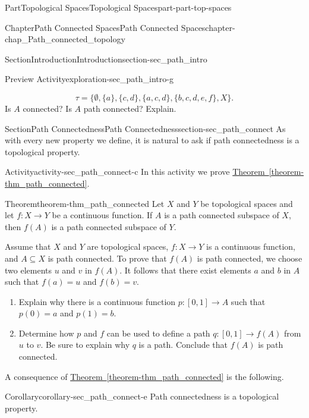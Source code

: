 \documentclass[oneside,10pt,]{book}
\newcommand{\xreffont}{\relax}
\numberwithin{equation}{chapter}
\begin{document}
\begin{partptx}{Part}{Topological Spaces}{}{Topological Spaces}{}{}{part-part-top-spaces}
\begin{chapterptx}{Chapter}{Path Connected Spaces}{}{Path Connected Spaces}{}{}{chapter-chap_Path_connected_topology}
\begin{sectionptx}{Section}{Introduction}{}{Introduction}{}{}{section-sec_path_intro}
\begin{exploration}{Preview Activity}{}{exploration-sec_path_intro-g}
\begin{enumerate}[font=\bfseries,label=(\alph*),ref=\alph*]
\begin{equation*}
\tau = \{\emptyset,\{a\}, \{c,d\}, \{a,c,d\}, \{b,c,d,e,f\}, X\}\text{.}
\end{equation*}
Is \(A\) connected? Is \(A\) path connected? Explain.%
\end{enumerate}%
\end{exploration}%
\end{sectionptx}
%
%
\typeout{************************************************}
\typeout{************************************************}
%
\begin{sectionptx}{Section}{Path Connectedness}{}{Path Connectedness}{}{}{section-sec_path_connect}
As with every new property we define, it is natural to ask if path connectedness is a topological property.%
\begin{activity}{Activity}{}{activity-sec_path_connect-c}%
In this activity we prove \hyperref[theorem-thm_path_connected]{Theorem~{\xreffont\ref{theorem-thm_path_connected}}}.%
\begin{theorem}{Theorem}{}{}{theorem-thm_path_connected}%
Let \(X\) and \(Y\) be topological spaces and let \(f : X \to Y\) be a continuous function. If \(A\) is a path connected subspace of \(X\), then \(f(A)\) is a path connected subspace of \(Y\).%
\end{theorem}
Assume that \(X\) and \(Y\) are topological spaces, \(f : X \to Y\) is a continuous function, and \(A \subseteq X\) is path connected. To prove that \(f(A)\) is path connected, we choose two elements \(u\) and \(v\) in \(f(A)\). It follows that there exist elements \(a\) and \(b\) in \(A\) such that \(f(a) = u\) and \(f(b) = v\).%
\begin{enumerate}[font=\bfseries,label=(\alph*),ref=\alph*]%
\item{}Explain why there is a continuous function \(p: [0,1] \to A\) such that \(p(0) = a\) and \(p(1) = b\).%
\item{}Determine how \(p\) and \(f\) can be used to define a path \(q: [0,1] \to f(A)\) from \(u\) to \(v\). Be sure to explain why \(q\) is a path. Conclude that \(f(A)\) is path connected.%
\end{enumerate}%
\end{activity}%
A consequence of \hyperref[theorem-thm_path_connected]{Theorem~{\xreffont\ref{theorem-thm_path_connected}}} is the following.%
\begin{corollary}{Corollary}{}{}{corollary-sec_path_connect-e}%
Path connectedness is a topological property.%
\end{corollary}

\end{sectionptx}
\end{chapterptx}
\end{partptx}
\end{document}
